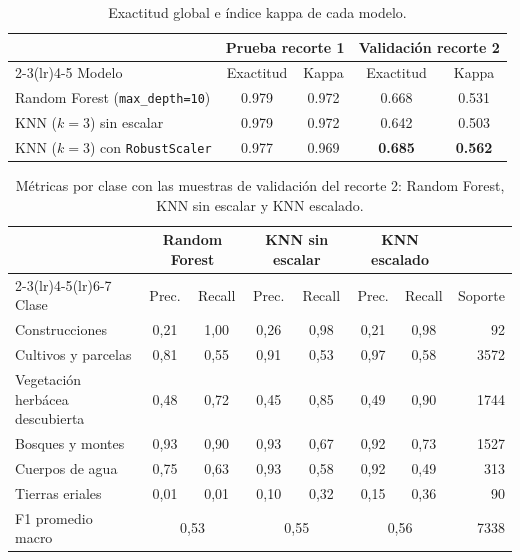 \documentclass[11pt,letterpaper]{article}
\begin{document}
\begin{table}[H]
\centering
\caption{Exactitud global e índice kappa de cada modelo.}
\label{tab:global}
\small
\begin{tabular}{@{}lcccc@{}}
\toprule
 & \multicolumn{2}{c}{Prueba recorte 1} & \multicolumn{2}{c}{Validación recorte 2} \\
\cmidrule(lr){2-3}\cmidrule(lr){4-5}
Modelo & Exactitud & Kappa & Exactitud & Kappa \\
\midrule
Random Forest (\texttt{max\_depth=10}) & \num{0.979} & \num{0.972} & \num{0.668} & \num{0.531} \\
KNN ($k=3$) sin escalar                & \num{0.979} & \num{0.972} & \num{0.642} & \num{0.503} \\
KNN ($k=3$) con \texttt{RobustScaler}  & \num{0.977} & \num{0.969} & \textbf{\num{0.685}} & \textbf{\num{0.562}} \\
\bottomrule
\end{tabular}
\end{table}

\begin{table}[H]
\centering
\caption{Métricas por clase con las muestras de validación del recorte 2: Random Forest, KNN sin escalar y KNN escalado.}
\label{tab:rf_val}
\small
\begin{tabular}{@{}lccccccr@{}}
\toprule
 & \multicolumn{2}{c}{Random Forest} & \multicolumn{2}{c}{KNN sin escalar} & \multicolumn{2}{c}{KNN escalado} & \\
\cmidrule(lr){2-3}\cmidrule(lr){4-5}\cmidrule(lr){6-7}
Clase & Prec. & Recall & Prec. & Recall & Prec. & Recall & Soporte \\
\midrule
Construcciones                  & 0,21 & 1,00 & 0,26 & 0,98 & 0,21 & 0,98 & 92   \\
Cultivos y parcelas             & 0,81 & 0,55 & 0,91 & 0,53 & 0,97 & 0,58 & \num{3572} \\
Vegetación herbácea descubierta & 0,48 & 0,72 & 0,45 & 0,85 & 0,49 & 0,90 & \num{1744} \\
Bosques y montes                & 0,93 & 0,90 & 0,93 & 0,67 & 0,92 & 0,73 & \num{1527} \\
Cuerpos de agua                 & 0,75 & 0,63 & 0,93 & 0,58 & 0,92 & 0,49 & 313  \\
Tierras eriales                 & 0,01 & 0,01 & 0,10 & 0,32 & 0,15 & 0,36 & 90   \\
\midrule
F1 promedio macro               & \multicolumn{2}{c}{0,53} & \multicolumn{2}{c}{0,55} & \multicolumn{2}{c}{0,56} & \num{7338} \\
\bottomrule
\end{tabular}
\end{table}
\end{document}
